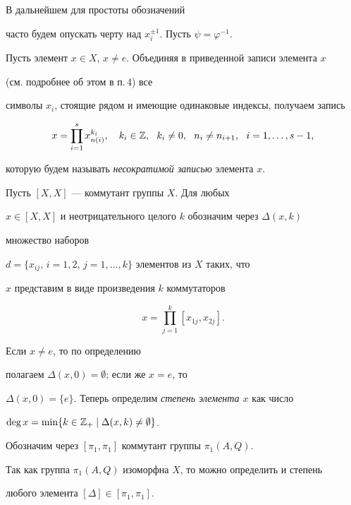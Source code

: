 В дальнейшем для простоты обозначений


часто будем опускать черту над $x^{\pm1}_i$. Пусть $\psi=\varphi^{-1}$.





Пусть элемент $x\in X$, $x\ne e$. Объединяя в приведенной записи элемента $x$


(см. подробнее об этом в п.\,4) все


символы $x_i$, стоящие рядом и имеющие одинаковые индексы, получаем запись


\begin{equation}


x=\prod_{i=1}^s x^{k_i}_{n(i)},\quad k_i\in


\Bbb Z,\ \ k_i\ne0,\ \ n_i\ne n_{i+1},\ \ i=1,\dotsc,s-1,


\label{(17.8)}


\end{equation}


которую будем называть {\it несократимой записью} элемента $x$.





Пусть $[X,X]$ --- коммутант группы $X$. Для любых


$x\in[X,X]$ и неотрицательного целого $k$ обозначим через $\Delta(x,k)$


множество наборов


$d=\{x_{ij}$, $i=1,2$, $j=1,\dotsc,k\}$ элементов из $X$ таких, что


$x$ представим в виде произведения $k$ коммутаторов


$$


x=\prod_{j=1}^k[x_{1j},x_{2j}].


$$


Если $x\ne e$, то по определению


полагаем $\Delta(x,0)=\emptyset$; если же $x=e$, то


$\Delta(x,0)=\{e\}$. Теперь определим {\it степень элемента $x$} как число


$\deg x=\min \{k\in\Bbb Z_+\mid


\Delta(x,k)\neq \emptyset \}$.





Обозначим через $[\pi_1,\pi_1]$ коммутант группы $\pi_1(A,Q)$.


Так как группа $\pi_1(A,Q)$ изоморфна $X$, то можно определить и степень


любого элемента $[\Delta]\in[\pi_1,\pi_1]$.





